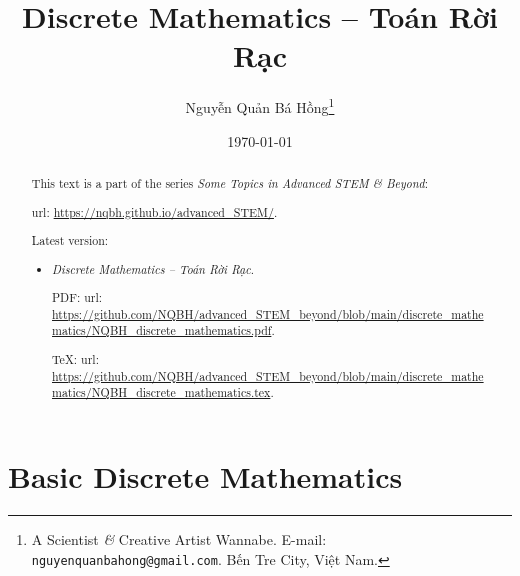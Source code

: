 \documentclass{article}
\title{Discrete Mathematics -- Toán Rời Rạc}
\author{Nguyễn Quản Bá Hồng\footnote{A Scientist {\it\&} Creative Artist Wannabe. E-mail: {\tt nguyenquanbahong@gmail.com}. Bến Tre City, Việt Nam.}}
\date{\today}
\begin{document}
\maketitle
\begin{abstract}
	This text is a part of the series {\it Some Topics in Advanced STEM \& Beyond}:
	
	{\sc url}: \url{https://nqbh.github.io/advanced_STEM/}.
	
	Latest version:
	\begin{itemize}
		\item {\it Discrete Mathematics -- Toán Rời Rạc}.
		
		PDF: {\sc url}: \url{https://github.com/NQBH/advanced_STEM_beyond/blob/main/discrete_mathematics/NQBH_discrete_mathematics.pdf}.
		
		\TeX: {\sc url}: \url{https://github.com/NQBH/advanced_STEM_beyond/blob/main/discrete_mathematics/NQBH_discrete_mathematics.tex}.
	\end{itemize}
\end{abstract}
\tableofcontents


\section{Basic Discrete Mathematics}
\end{document}
